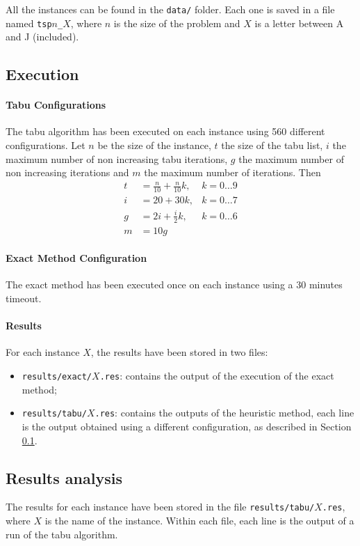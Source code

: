 \documentclass{article}
\begin{document}
All the instances can be found in the \texttt{data/} folder.
Each one is saved in a file named \texttt{tsp$n$\_$X$}, where $n$ is the size of the problem and $X$ is a letter between A and J (included).

\subsection{Execution}
\label{sec:exp:exe}

\paragraph{Tabu Configurations}
The tabu algorithm has been executed on each instance using 560 different configurations.
Let $n$ be the size of the instance, $t$ the size of the tabu list, $i$ the maximum number of non increasing tabu iterations, $g$ the maximum number of non increasing iterations and $m$ the maximum number of iterations.
Then
\begin{align*}
    t & = \frac{n}{10} + \frac{n}{10} k, & k = 0 \dots 9 \\
    i & = 20 + 30 k,                     & k = 0 \dots 7 \\
    g & = 2 i + \frac{i}{2} k,           & k = 0 \dots 6 \\
    m & = 10 g
\end{align*}

\paragraph{Exact Method Configuration}
The exact method has been executed once on each instance using a 30 minutes timeout.

\paragraph{Results}
For each instance $X$, the results have been stored in two files:
\begin{itemize}
    \item \texttt{results/exact/$X$.res}: contains the output of the execution of the exact method;
    \item \texttt{results/tabu/$X$.res}: contains the outputs of the heuristic method, each line is the output obtained using a different configuration, as described in Section \ref{sec:exp:exe}.
\end{itemize}

\subsection{Results analysis}
\label{sec:exp:res}
The results for each instance have been stored in the file \texttt{results/tabu/$X$.res}, where $X$ is the name of the instance.
Within each file, each line is the output of a run of the tabu algorithm.
\end{document}
